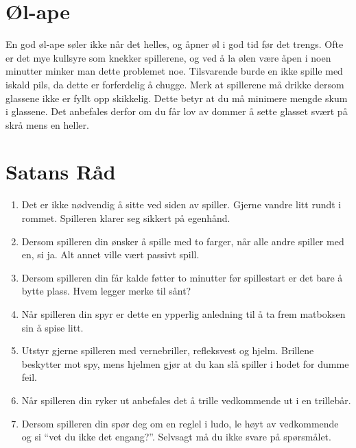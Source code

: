 \documentclass[10pt,a4paper,norsk,openany]{book}
\begin{document}
\section{Øl-ape}
\label{sec:ol-ape}

En god øl-ape søler ikke når det helles, og åpner øl i god tid før det trengs.
Ofte er det mye kullsyre som knekker spillerene, og ved å la ølen være åpen i
noen minutter minker man dette problemet noe. Tilsvarende burde en ikke spille
med iskald pils, da dette er forferdelig å chugge. Merk at spillerene må drikke
dersom glassene ikke er fyllt opp skikkelig. Dette betyr at du må minimere
mengde skum i glassene. Det anbefales derfor om du får lov av dommer å sette
glasset svært på skrå mens en heller. 


\section{Satans Råd}

\begin{enumerate}
  \item Det er ikke nødvendig å sitte ved siden av spiller. Gjerne vandre litt
    rundt i rommet. Spilleren klarer seg sikkert på egenhånd.
    
  \item Dersom spilleren din ønsker å spille med to farger, når alle andre
    spiller med en, si ja. Alt annet ville vært passivt spill.

  \item Dersom spilleren din får kalde føtter to minutter før spillestart er det
    bare å bytte plass. Hvem legger merke til sånt?

  \item Når spilleren din spyr er dette en ypperlig anledning til å ta frem
    matboksen sin å spise litt.

  \item Utstyr gjerne spilleren med vernebriller, refleksvest og hjelm. Brillene
    beskytter mot spy, mens hjelmen gjør at du kan slå spiller i hodet for dumme
    feil.

  \item Når spilleren din ryker ut anbefales det å trille vedkommende ut i en
    trillebår.

  \item Dersom spilleren din spør deg om en reglel i ludo, le høyt av vedkommende
    og si ``vet du ikke det engang?''. Selvsagt må du ikke svare på spørsmålet.
\end{enumerate}
\end{document}
